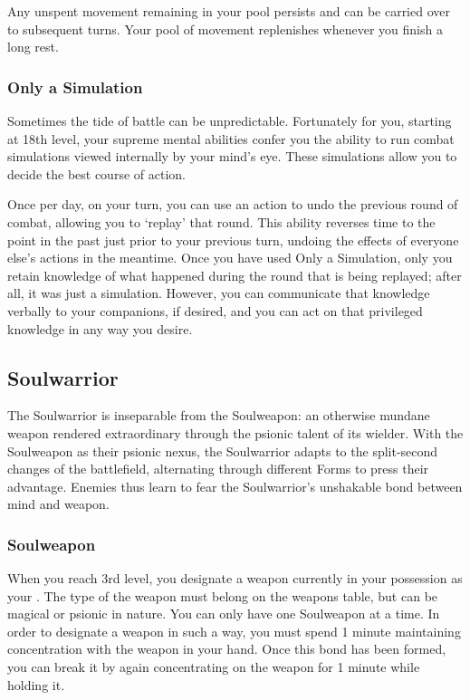 Any unspent movement remaining in your pool persists
and can be carried over to subsequent turns.
Your pool of movement replenishes whenever you finish a long rest.

\subsubsection{Only a Simulation}
Sometimes the tide of battle can be unpredictable.
Fortunately for you,
starting at 18th level,
your supreme mental abilities confer you the ability to
run combat simulations viewed internally by your mind's eye.
These simulations allow you to decide the best course of action.

Once per day, on your turn,
you can use an action to undo the previous round of combat,
allowing you to `replay' that round.
This ability reverses time to the point in the past
just prior to your previous turn,
undoing the effects of everyone else's actions in the meantime.
Once you have used Only a Simulation,
only you retain knowledge of what happened during the round
that is being replayed; after all, it was just a simulation.
However, you can communicate that knowledge verbally to your companions,
if desired,
and you can act on that privileged knowledge
in any way you desire.

\subsection{Soulwarrior}
The Soulwarrior is inseparable from the Soulweapon:
an otherwise mundane weapon rendered extraordinary through the psionic talent of its wielder.
With the Soulweapon as their psionic nexus,
the Soulwarrior adapts to the split-second changes of the battlefield,
alternating through different Forms to press their advantage.
Enemies thus learn to fear the Soulwarrior's unshakable bond between mind and weapon.

\subsubsection{Soulweapon}
When you reach 3rd level,
you designate a weapon currently in your possession as your .
The type of the weapon must belong on the weapons table,
but can be magical or psionic in nature.
You can only have one Soulweapon at a time.
In order to designate a weapon in such a way,
you must spend 1 minute maintaining concentration with the weapon in your hand.
Once this bond has been formed, 
you can break it by again concentrating on the weapon for 1 minute while holding it.

